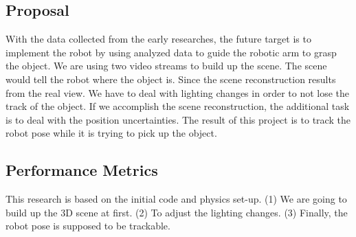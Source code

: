 \documentclass[letterpaper,10pt,fleqn,draftclsnofoot,onecolumn]{IEEEtran}
\begin{document}
{	\subsection{Proposal}
	With the data collected from the early researches, the future target is to implement the robot by using analyzed data to guide the robotic arm to grasp the object. We are using two video streams to build up the scene. The scene would tell the robot where the object is. Since the scene reconstruction results from the real view. We have to deal with lighting changes in order to not lose the track of the object. If we accomplish the scene reconstruction, the additional task is to deal with the position uncertainties. The result of this project is to track the robot pose while it is trying to pick up the object. \newline
	
	\subsection{Performance Metrics}
	This research is based on the initial code and physics set-up. (1) We are going to build up the 3D scene at first. (2) To adjust the lighting changes. (3) Finally, the robot pose is supposed to be trackable.
	
}
\end{document}
